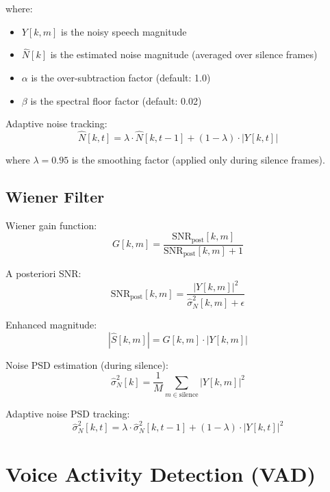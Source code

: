 \documentclass[12pt,a4paper]{article}
\begin{document}
where:
\begin{itemize}
    \item $Y[k, m]$ is the noisy speech magnitude
    \item $\hat{N}[k]$ is the estimated noise magnitude (averaged over silence frames)
    \item $\alpha$ is the over-subtraction factor (default: 1.0)
    \item $\beta$ is the spectral floor factor (default: 0.02)
\end{itemize}

Adaptive noise tracking:
\begin{equation}
\hat{N}[k, t] = \lambda \cdot \hat{N}[k, t-1] + (1 - \lambda) \cdot |Y[k, t]|
\end{equation}

where $\lambda = 0.95$ is the smoothing factor (applied only during silence frames).

\subsection{Wiener Filter}

Wiener gain function:
\begin{equation}
G[k, m] = \frac{\text{SNR}_{\text{post}}[k, m]}{\text{SNR}_{\text{post}}[k, m] + 1}
\end{equation}

A posteriori SNR:
\begin{equation}
\text{SNR}_{\text{post}}[k, m] = \frac{|Y[k, m]|^2}{\hat{\sigma}_N^2[k, m] + \epsilon}
\end{equation}

Enhanced magnitude:
\begin{equation}
|\hat{S}[k, m]| = G[k, m] \cdot |Y[k, m]|
\end{equation}

Noise PSD estimation (during silence):
\begin{equation}
\hat{\sigma}_N^2[k] = \frac{1}{M} \sum_{m \in \text{silence}} |Y[k, m]|^2
\end{equation}

Adaptive noise PSD tracking:
\begin{equation}
\hat{\sigma}_N^2[k, t] = \lambda \cdot \hat{\sigma}_N^2[k, t-1] + (1 - \lambda) \cdot |Y[k, t]|^2
\end{equation}

\section{Voice Activity Detection (VAD)}
\end{document}
